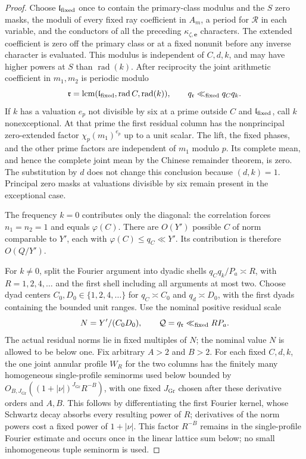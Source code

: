 \documentclass[11pt,a4paper]{article}
\numberwithin{equation}{section}
\numberwithin{figure}{section}
\theoremstyle{definition}
\theoremstyle{remark}
\begin{document}
\begin{proof}
Choose $\mathfrak l_{\rm fixed}$ once to contain the primary-class
modulus and the $S$ zero masks, the moduli of every fixed ray
coefficient in $A_m$, a period for $\mathcal R$ in each variable,
and the conductors of all the preceding
$\kappa_{\zeta,\boldsymbol e}$ characters.  The
extended coefficient is zero off the primary class or at a fixed
nonunit before any inverse character is evaluated.  This modulus is
independent of $C,d,k$, and may have higher powers at $S$ than
$\operatorname{rad}(k)$.  After reciprocity the joint arithmetic
coefficient in $m_1,m_2$ is periodic modulo
\[
 \mathfrak r=\operatorname{lcm}
   (\mathfrak l_{\rm fixed},\operatorname{rad}C,\operatorname{rad}(k)),
 \qquad q_{\mathfrak r}\ll_{\rm fixed}q_Cq_k.
\]
If $k$ has a valuation $e_p$ not divisible by six at a prime outside
$C$ and $\mathfrak l_{\rm fixed}$, call $k$ nonexceptional.  At that
prime the first residual column has the nonprincipal zero-extended
factor $\chi_p(m_1)^{e_p}$ up to a unit scalar.  The lift, the fixed
phases, and the other prime factors are independent of $m_1$ modulo
$p$.  Its complete mean, and hence the complete joint mean by the
Chinese remainder theorem, is zero.  The substitution by $d$ does
not change this conclusion because $(d,k)=1$.  Principal zero masks
at valuations divisible by six remain present in the exceptional
case.

The frequency $k=0$ contributes only the diagonal: the correlation
forces $n_1=n_2=1$ and equals $\varphi(C)$.  There are $O(Y')$
possible $C$ of norm comparable to $Y'$, each with
$\varphi(C)\le q_C\ll Y'$.  Its contribution is therefore
$O(Q/Y')$.

For $k\ne0$, split the Fourier argument into dyadic shells
$q_Cq_k/P_a\asymp R$, with $R=1,2,4,\ldots$ and the first shell
including all arguments at most two.  Choose dyad centers
$C_0,D_0\in\{1,2,4,\ldots\}$ for $q_C\asymp C_0$ and
$q_d\asymp D_0$, with the first dyads containing the bounded unit ranges.
Use the nominal positive residual scale
\[
 N=Y'/(C_0D_0),\qquad
 \mathcal Q=q_{\mathfrak r}\ll_{\rm fixed}RP_a.
\]
The actual residual norms lie in fixed multiples of $N$; the nominal value
$N$ is allowed to be below one.  Fix arbitrary $A>2$ and $B>2$.
For each fixed $C,d,k$, the one joint annular profile $W_R$ for the two
columns has the finitely many homogeneous single-profile seminorms used
below bounded by
$O_{B,J_{\mathrm{Gr}}}((1+|\nu|)^{J_{\mathrm{Gr}}} R^{-B})$, with one fixed
$J_{\mathrm{Gr}}$ chosen after these derivative orders and $A,B$.  This
follows by differentiating the
first Fourier kernel, whose Schwartz decay absorbs every resulting
power of $R$; derivatives of the norm powers cost a fixed power of
$1+|\nu|$.  This factor $R^{-B}$ remains in the single-profile
Fourier estimate and occurs once in the linear lattice sum below;
no small inhomogeneous tuple seminorm is used.


\end{proof}
\end{document}
